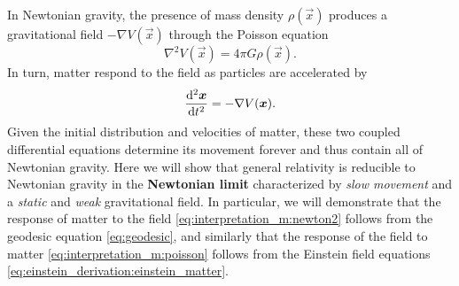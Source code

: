 In Newtonian gravity, the presence of mass density $\rho(\vec{x})$ produces a gravitational field $-\nabla V(\vec{x})$ through the Poisson equation
\begin{equation}
	\nabla^2 V(\vec{x}) = 4 \pi G \rho(\vec{x}) .
	\label{eq:interpretation_m:poisson}
\end{equation}
In turn, matter respond to the field as particles are accelerated by
\begin{equation}
	\odv[2]{\vec{x}}{t} = - \nabla V(\vec{x}) .
	\label{eq:interpretation_m:newton2}
\end{equation}
Given the initial distribution and velocities of matter, these two coupled differential equations determine its movement forever and thus contain all of Newtonian gravity.
Here we will show that general relativity is reducible to Newtonian gravity in the \textbf{Newtonian limit} characterized by \emph{slow movement} and a \emph{static} and \emph{weak} gravitational field.
In particular, we will demonstrate that the response of matter to the field \eqref{eq:interpretation_m:newton2} follows from the geodesic equation \eqref{eq:geodesic}, and similarly that the response of the field to matter \eqref{eq:interpretation_m:poisson} follows from the Einstein field equations \eqref{eq:einstein_derivation:einstein_matter}.

